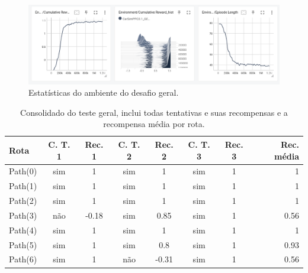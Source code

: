 \begin{figure}[h]
    \centering
    \includegraphics[scale=0.35]{figs/treinos/desafio-geral/ambiente.png}
    \caption{Estatísticas do ambiente do desafio geral.}
\end{figure}

\begin{table}[htpb]
    \centering
    \caption{Consolidado do teste geral, inclui todas tentativas e suas recompensas e a recompensa média por rota.}
    \label{resultado-tabela-geral}
    \begin{tabular}{|l|c|c|c|c|c|c|r|}
         \hline
         \small{Rota} & \small{C. T. 1} & \small{Rec. 1}  & \small{C. T. 2} &\small{Rec. 2} & \small{C. T. 3} &\small{Rec. 3} &\small{Rec. média}   \\ \hline
            Path(0)   &      sim        &   1             &    sim          &      1        &    sim          &      1     &      1                 \\ \hline
            Path(1)   &      sim        &   1             &    sim          &      1        &    sim          &      1     &      1                 \\ \hline
            Path(2)   &      sim        &   1             &    sim          &      1        &    sim          &      1     &      1                 \\ \hline
            Path(3)   &      não        &   -0.18         &    sim          &      0.85     &    sim          &      1     &      0.56              \\ \hline
            Path(4)   &      sim        &   1             &    sim          &      1        &    sim          &      1     &      1                 \\ \hline
            Path(5)   &      sim        &   1             &    sim          &      0.8      &    sim          &      1     &      0.93              \\ \hline
            Path(6)   &      sim        &   1             &    não          &      -0.31    &    sim          &      1     &      0.56              \\ \hline

\end{tabular}
\end{table}
